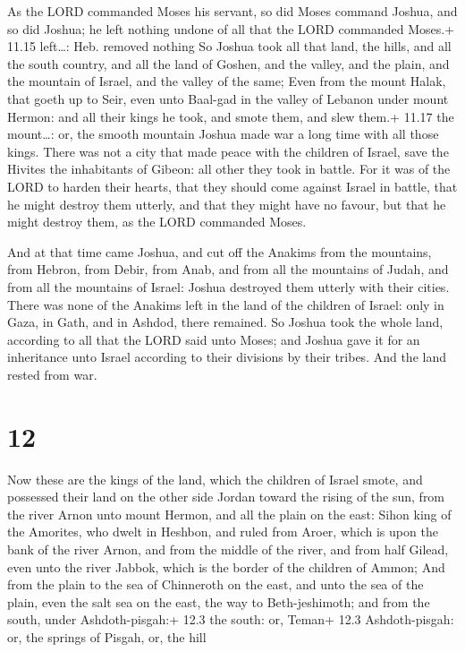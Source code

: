  As the LORD commanded Moses his servant, so did Moses
command Joshua, and so did Joshua; he left nothing undone of all that
the LORD commanded Moses.+ 11.15 left\ldots: Heb. removed nothing
 So Joshua took all that land, the hills, and all the south
country, and all the land of Goshen, and the valley, and the plain, and
the mountain of Israel, and the valley of the same;  Even
from the mount Halak, that goeth up to Seir, even unto Baal-gad in the
valley of Lebanon under mount Hermon: and all their kings he took, and
smote them, and slew them.+ 11.17 the mount\ldots: or, the smooth
mountain  Joshua made war a long time with all those kings.
 There was not a city that made peace with the children of
Israel, save the Hivites the inhabitants of Gibeon: all other they took
in battle.  For it was of the LORD to harden their hearts,
that they should come against Israel in battle, that he might destroy
them utterly, and that they might have no favour, but that he might
destroy them, as the LORD commanded Moses.

 And at that time came Joshua, and cut off the Anakims
from the mountains, from Hebron, from Debir, from Anab, and from all the
mountains of Judah, and from all the mountains of Israel: Joshua
destroyed them utterly with their cities.  There was none
of the Anakims left in the land of the children of Israel: only in Gaza,
in Gath, and in Ashdod, there remained.  So Joshua took the
whole land, according to all that the LORD said unto Moses; and Joshua
gave it for an inheritance unto Israel according to their divisions by
their tribes. And the land rested from war.

\hypertarget{section-11}{%
\section{12}\label{section-11}}

 Now these are the kings of the land, which the children of
Israel smote, and possessed their land on the other side Jordan toward
the rising of the sun, from the river Arnon unto mount Hermon, and all
the plain on the east:  Sihon king of the Amorites, who
dwelt in Heshbon, and ruled from Aroer, which is upon the bank of the
river Arnon, and from the middle of the river, and from half Gilead,
even unto the river Jabbok, which is the border of the children of
Ammon;  And from the plain to the sea of Chinneroth on the
east, and unto the sea of the plain, even the salt sea on the east, the
way to Beth-jeshimoth; and from the south, under Ashdoth-pisgah:+ 12.3
the south: or, Teman+ 12.3 Ashdoth-pisgah: or, the springs of Pisgah,
or, the hill

